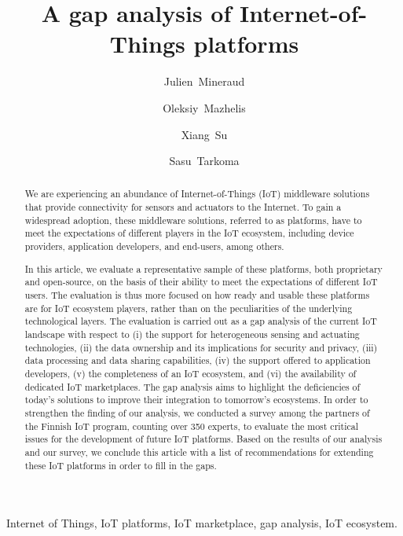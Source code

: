 \documentclass[preprint,10pt,5p]{elsarticle}
\begin{document}
\begin{frontmatter}
  \title{A gap analysis of Internet-of-Things platforms}
  \author[uh]{Julien~Mineraud}
  \author[jyy]{Oleksiy~Mazhelis}
  \author[oy]{Xiang~Su}
  \author[uh]{Sasu~Tarkoma}

  \address[uh]{Department of Computer Science, University of Helsinki,
    Finland}
  \address[jyy]{Department of Computer Science and Information
    Systems, University of Jyv\"{a}skyl\"{a}, Finland}
  \address[oy]{Center for Ubiquitous Computing, University of Oulu, Finland}
  
  \begin{abstract} 
    We are experiencing an abundance of Internet-of-Things (IoT) middleware 
    solutions that provide connectivity for sensors and actuators to the Internet.
    To gain a widespread adoption, these middleware solutions, referred to as 
    platforms, have to meet the expectations of different players in the IoT
    ecosystem, including device providers, application developers,
    and end-users, among others.

    In this article, we evaluate a representative sample of these platforms, 
    both proprietary and open-source, on the basis of their ability to meet 
    the expectations of different IoT users. 
    The evaluation is thus more focused on how ready and usable these platforms
    are for IoT ecosystem players, rather than on the peculiarities of the 
    underlying technological layers.
    The evaluation is carried out as a gap analysis of the current IoT landscape 
    with respect to 
    (i) the support for heterogeneous sensing and actuating technologies,
    (ii) the data ownership and its implications for security and privacy,
    (iii) data processing and data sharing capabilities,
    (iv) the support offered to application developers, 
    (v) the completeness of an IoT ecosystem, and
    (vi) the availability of dedicated IoT marketplaces.
    The gap analysis aims to highlight the deficiencies of today's solutions 
    to improve their integration to tomorrow's ecosystems. 
    In order to strengthen the finding of our analysis, we conducted a
    survey among the partners of the Finnish IoT program,
    counting over 350 experts, to evaluate the most critical issues for the
    development of future IoT platforms.
    Based on the results of our analysis and our survey, we conclude this
    article with a list of recommendations for extending these IoT
    platforms in order to fill in the gaps.
  \end{abstract}


  \begin{keyword}
    Internet of Things, IoT platforms, IoT marketplace, gap analysis, IoT ecosystem.
  \end{keyword}

\end{frontmatter}
\end{document}
